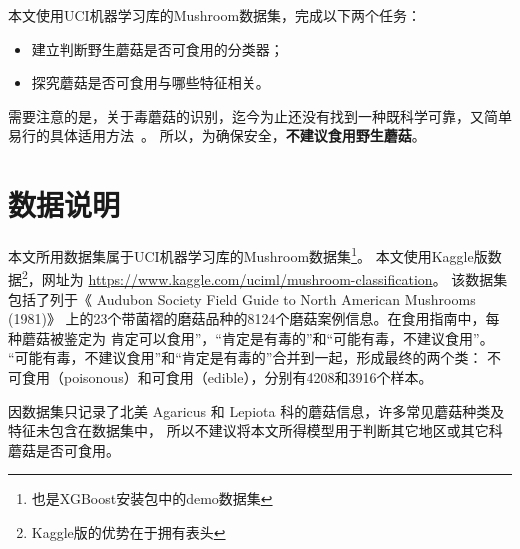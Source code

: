 \documentclass[lang=cn,11pt,a4paper,cite=super]{elegantpaper}
\begin{document}
本文使用UCI机器学习库的Mushroom数据集，完成以下两个任务：
\begin{itemize}
   \item 建立判断野生蘑菇是否可食用的分类器；
   \item 探究蘑菇是否可食用与哪些特征相关。
\end{itemize}
需要注意的是，关于毒蘑菇的识别，迄今为止还没有找到一种既科学可靠，又简单易行的具体适用方法~\cite{jianbie}。
所以，为确保安全，\textbf{不建议食用野生蘑菇}。

\section{数据说明}
本文所用数据集属于UCI机器学习库的Mushroom数据集\footnote{也是XGBoost安装包中的demo数据集}。
本文使用Kaggle版数据\footnote{Kaggle版的优势在于拥有表头}，网址为 \url{https://www.kaggle.com/uciml/mushroom-classification}。
该数据集包括了列于《 Audubon Society Field Guide to North American Mushrooms (1981)》
上的23个带菌褶的磨菇品种的8124个磨菇案例信息。在食用指南中，每种蘑菇被鉴定为
肯定可以食用”，“肯定是有毒的”和“可能有毒，不建议食用”。
“可能有毒，不建议食用”和“肯定是有毒的”合并到一起，形成最终的两个类：
不可食用（poisonous）和可食用（edible），分别有4208和3916个样本。

因数据集只记录了北美 Agaricus 和 Lepiota 科的蘑菇信息，许多常见蘑菇种类及特征未包含在数据集中，
所以不建议将本文所得模型用于判断其它地区或其它科蘑菇是否可食用。
\end{document}
